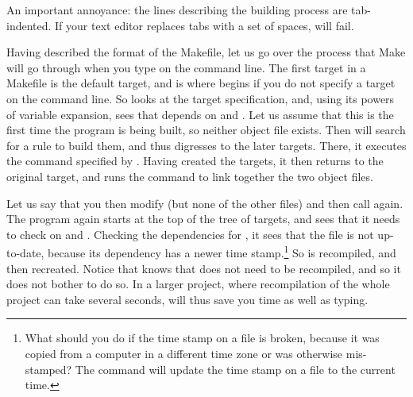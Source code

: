 An important annoyance: the lines describing the building
process are tab-indented. If your text editor replaces tabs with a set
of spaces,  will fail.

Having described the format of the Makefile, let us go over the process
that Make will go through when you type  on the command line.
The first target in a Makefile is the default target, and is where
 begins if you do not specify a target on the command line. So
 looks at the target specification, and, using its powers of
variable expansion, sees that  depends on  and
. Let us assume that this is the first time the program is
being built, so neither object file exists. Then  will search
for a rule to build them, and thus digresses to the later targets.
There, it executes the command specified by .
Having created the targets, it then returns to the original target, and
runs the command to link together the two object files. 

Let us say that you then modify  (but none of the other
files) and then call  again. The program again starts at the
top of the tree of targets, and sees that it needs to check on
 and . Checking the dependencies for
, it sees that the file is not up-to-date, because its
dependency has a newer time stamp.\footnote{What should you do if the
time stamp on a file is broken, because it was copied from a computer in
a different time zone or was otherwise mis-stamped? The 
command will update the time stamp on a file to the current time.}
So  is recompiled, and  then recreated. Notice
that  knows that  does not need to be recompiled,
and so it does not bother to do so. In a larger project, where
recompilation of the whole project can take several seconds, 
will thus save you time as well as typing.



